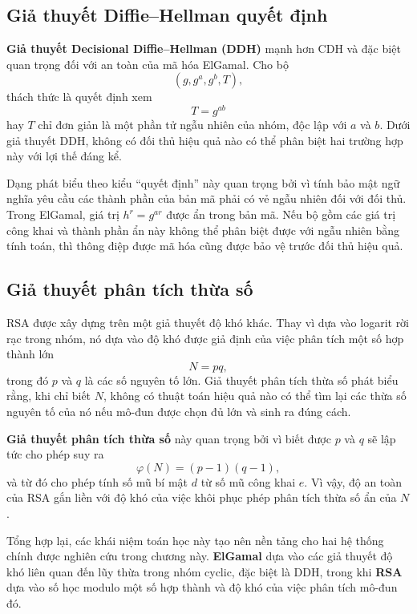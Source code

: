 \subsection{Giả thuyết Diffie--Hellman quyết định}

\textbf{Giả thuyết Decisional Diffie--Hellman (DDH)} mạnh hơn CDH và đặc biệt quan trọng đối với an toàn của mã hóa ElGamal. Cho bộ
\[
(g, g^a, g^b, T),
\]
thách thức là quyết định xem
\[
T = g^{ab}
\]
hay $T$ chỉ đơn giản là một phần tử ngẫu nhiên của nhóm, độc lập với $a$ và $b$. Dưới giả thuyết DDH, không có đối thủ hiệu quả nào có thể phân biệt hai trường hợp này với lợi thế đáng kể.

Dạng phát biểu theo kiểu ``quyết định'' này quan trọng bởi vì tính bảo mật ngữ nghĩa yêu cầu các thành phần của bản mã phải có vẻ ngẫu nhiên đối với đối thủ. Trong ElGamal, giá trị $h^r = g^{ar}$ được ẩn trong bản mã. Nếu bộ gồm các giá trị công khai và thành phần ẩn này không thể phân biệt được với ngẫu nhiên bằng tính toán, thì thông điệp được mã hóa cũng được bảo vệ trước đối thủ hiệu quả.

\subsection{Giả thuyết phân tích thừa số}

RSA được xây dựng trên một giả thuyết độ khó khác. Thay vì dựa vào logarit rời rạc trong nhóm, nó dựa vào độ khó được giả định của việc phân tích một số hợp thành lớn
\[
N = pq,
\]
trong đó $p$ và $q$ là các số nguyên tố lớn. Giả thuyết phân tích thừa số phát biểu rằng, khi chỉ biết $N$, không có thuật toán hiệu quả nào có thể tìm lại các thừa số nguyên tố của nó nếu mô-đun được chọn đủ lớn và sinh ra đúng cách.

\textbf{Giả thuyết phân tích thừa số} này quan trọng bởi vì biết được $p$ và $q$ sẽ lập tức cho phép suy ra
\[
\varphi(N) = (p-1)(q-1),
\]
và từ đó cho phép tính số mũ bí mật $d$ từ số mũ công khai $e$. Vì vậy, độ an toàn của RSA gắn liền với độ khó của việc khôi phục phép phân tích thừa số ẩn của $N$.

Tổng hợp lại, các khái niệm toán học này tạo nên nền tảng cho hai hệ thống chính được nghiên cứu trong chương này. \textbf{ElGamal} dựa vào các giả thuyết độ khó liên quan đến lũy thừa trong nhóm cyclic, đặc biệt là DDH, trong khi \textbf{RSA} dựa vào số học modulo một số hợp thành và độ khó của việc phân tích mô-đun đó.
